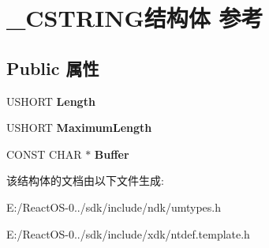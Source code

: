 \hypertarget{struct___c_s_t_r_i_n_g}{}\section{\+\_\+\+C\+S\+T\+R\+I\+N\+G结构体 参考}
\label{struct___c_s_t_r_i_n_g}
\subsection*{Public 属性}
\begin{DoxyCompactItemize}
\item 
\mbox{\label{struct___c_s_t_r_i_n_g_afa79ec19db311ab700f6e4635875429d}} 
U\+S\+H\+O\+RT {\bfseries Length}
\item 
\mbox{\label{struct___c_s_t_r_i_n_g_a3db063253c30f1b6aac0e03e0276d6c1}} 
U\+S\+H\+O\+RT {\bfseries Maximum\+Length}
\item 
\mbox{\label{struct___c_s_t_r_i_n_g_a5496f6d7592f1623251054f2a5d1a965}} 
C\+O\+N\+ST C\+H\+AR $\ast$ {\bfseries Buffer}
\end{DoxyCompactItemize}


该结构体的文档由以下文件生成\+:\begin{DoxyCompactItemize}
\item 
E\+:/\+React\+O\+S-\/0../sdk/include/ndk/umtypes.\+h\item 
E\+:/\+React\+O\+S-\/0../sdk/include/xdk/ntdef.\+template.\+h\end{DoxyCompactItemize}
